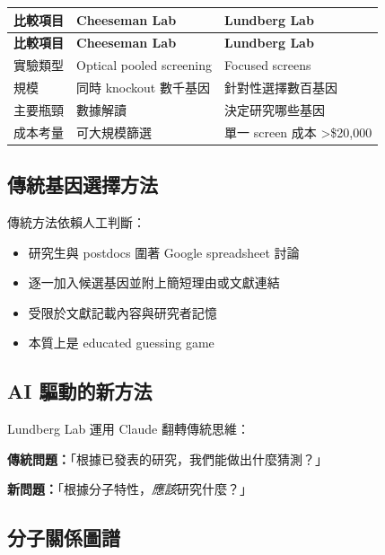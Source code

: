 \documentclass[12pt,a4paper]{article}
\begin{document}
\begin{longtable}{p{4cm}p{5cm}p{5cm}}
\toprule
\textbf{比較項目} & \textbf{Cheeseman Lab} & \textbf{Lundberg Lab} \\
\midrule
\endfirsthead

\toprule
\textbf{比較項目} & \textbf{Cheeseman Lab} & \textbf{Lundberg Lab} \\
\midrule
\endhead

\bottomrule
\endfoot

實驗類型 & Optical pooled screening & Focused screens \\
\midrule
規模 & 同時 knockout 數千基因 & 針對性選擇數百基因 \\
\midrule
主要瓶頸 & 數據解讀 & 決定研究哪些基因 \\
\midrule
成本考量 & 可大規模篩選 & 單一 screen 成本 >\$20,000 \\
\bottomrule
\end{longtable}

\subsection{傳統基因選擇方法}

傳統方法依賴人工判斷：
\begin{itemize}
    \item 研究生與 postdocs 圍著 Google spreadsheet 討論
    \item 逐一加入候選基因並附上簡短理由或文獻連結
    \item 受限於文獻記載內容與研究者記憶
    \item 本質上是 educated guessing game
\end{itemize}

\subsection{AI 驅動的新方法}

Lundberg Lab 運用 Claude 翻轉傳統思維：

\begin{tcolorbox}[colback=highlight_yellow,colframe=emergency_red]
\textbf{傳統問題：}「根據已發表的研究，我們能做出什麼猜測？」

\textbf{新問題：}「根據分子特性，\textit{應該}研究什麼？」
\end{tcolorbox}

\subsection{分子關係圖譜}
\end{document}
